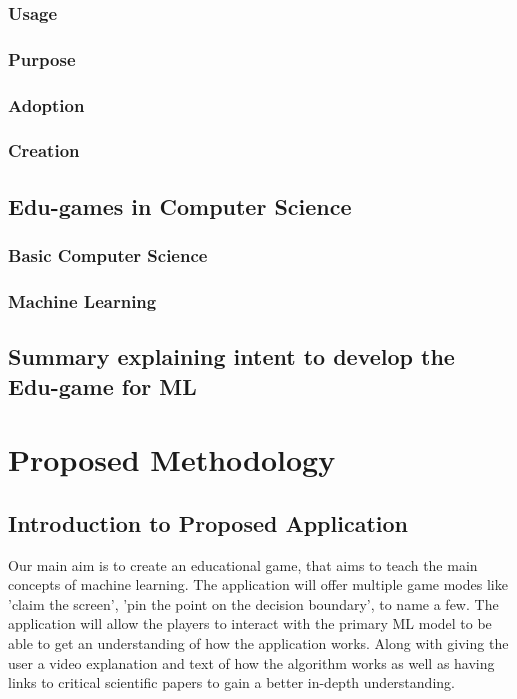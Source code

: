 \documentclass[a4paper,10pt]{article}
\begin{document}
\subsubsection{Usage}
\subsubsection{Purpose}
\subsubsection{Adoption}
\subsubsection{Creation}

\subsection{Edu-games in Computer Science}
\subsubsection{Basic Computer Science}
\subsubsection{Machine Learning}


\subsection{Summary explaining intent to develop the Edu-game for ML}


\section{Proposed Methodology}
\subsection{Introduction to Proposed Application}
Our main aim is to create an educational game, that aims to teach the main concepts of machine learning. The application will offer multiple game modes like 'claim the screen', 'pin the point on the decision boundary', to name a few. The application will allow the players to interact with the primary ML model to be able to get an understanding of how the application works. Along with giving the user a video explanation and text of how the algorithm works as well as having links to critical scientific papers to gain a better in-depth understanding.  
\end{document}

